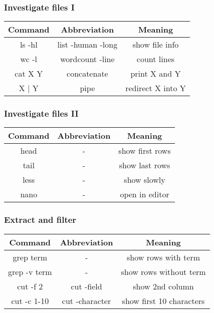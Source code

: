 \documentclass[]{beamer}
\newcommand\Fontlarge{\fontsize{12}{30.4}\selectfont}
\begin{document}

\begin{frame}
\frametitle{Investigate files I}

\Fontlarge

\begin{table}[h]
\begin{tabular}{ccc}
\textbf{Command} & \textbf{Abbreviation} & \textbf{Meaning}  \\ \hline
ls -hl           & list -human -long     & show file info    \\ \hline
wc -l            & wordcount -line       & count lines       \\ \hline
cat X Y          & concatenate           & print X and Y     \\ \hline
X | Y            & pipe                  & redirect X into Y
\end{tabular}
\end{table}

\end{frame}


\begin{frame}
\frametitle{Investigate files II}

\Fontlarge
\begin{table}[h]
\begin{tabular}{ccc}
\textbf{Command} & \textbf{Abbreviation} & \textbf{Meaning} \\ \hline
head             & -                     & show first rows  \\ \hline
tail             & -                     & show last rows   \\ \hline
less             & -                     & show slowly      \\ \hline
nano             & -                     & open in editor   
\end{tabular}
\end{table}
\end{frame}


\begin{frame}
\frametitle{Extract and filter}

\Fontlarge
\begin{table}[h]
\begin{tabular}{ccc}
\textbf{Command} & \textbf{Abbreviation} & \textbf{Meaning} \\ \hline
grep term            & -                     & show rows with term \\ \hline
grep -v term         & -                     & show rows without term  \\ \hline
cut -f 2             & cut -field            & show 2nd column  \\ \hline
cut -c 1-10          & cut -character        & show first 10 characters  
\end{tabular}
\end{table}

\end{frame}
\end{document}
